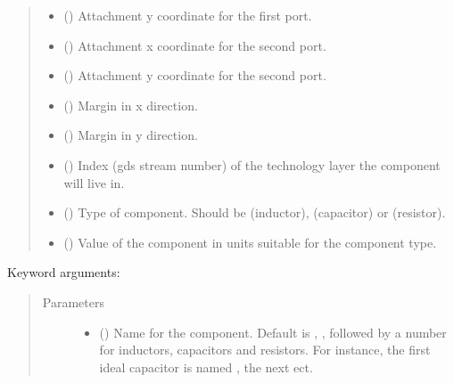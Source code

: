 \documentclass[letterpaper,10pt,english,openany]{sphinxmanual}
\begin{document}
\begin{fulllineitems}
\begin{fulllineitems}
\begin{quote}
\begin{description}
\begin{itemize}
\item {} 
 () \textendash{} Attachment y coordinate for the first port.

\item {} 
 () \textendash{} Attachment x coordinate for the second port.

\item {} 
 () \textendash{} Attachment y coordinate for the second port.

\item {} 
 () \textendash{} Margin in x direction.

\item {} 
 () \textendash{} Margin in y direction.

\item {} 
 () \textendash{} Index (gds stream number) of the technology layer the component will live in.

\item {} 
 () \textendash{} Type of component. Should be  (inductor),  (capacitor) or  (resistor).

\item {} 
 () \textendash{} Value of the component in units suitable for the component type.

\end{itemize}

\end{description}\end{quote}

Keyword arguments:
\begin{quote}\begin{description}
\item[{Parameters}] \leavevmode\begin{itemize}
\item {} 
 () \textendash{} Name for the component. Default is , ,  followed by a number for inductors, capacitors and resistors. For instance, the first ideal capacitor is named , the next  ect.


\end{itemize}
\end{description}
\end{quote}
\end{fulllineitems}
\end{fulllineitems}
\end{document}
